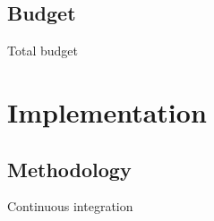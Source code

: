 \documentclass{beamer}
\begin{document}
\subsection{Budget}
\begin{frame}{Total budget}

\end{frame}
\section{Implementation}
\subsection{Methodology}
\begin{frame}{Continuous integration}
\begin{center}
\noindent{}
\end{center}
\end{frame}
\end{document}
